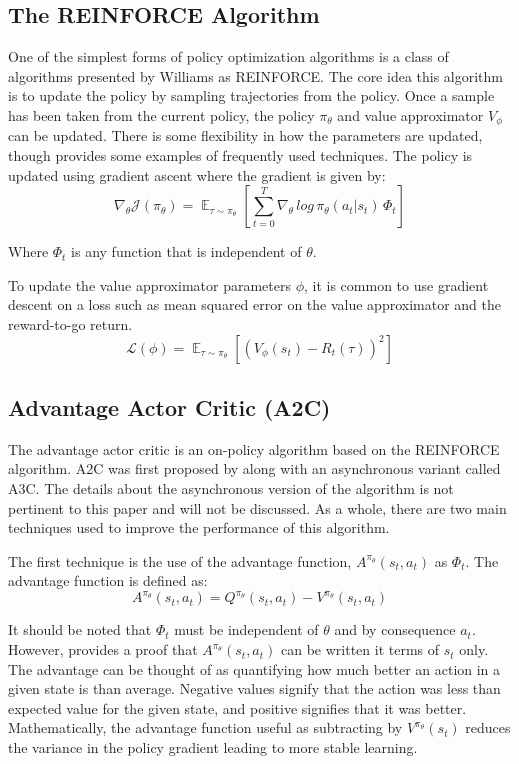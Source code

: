 \documentclass[conference]{IEEEtran}
\begin{document}
\subsection{The REINFORCE Algorithm}

One of the simplest forms of policy optimization algorithms is a class of algorithms presented by Williams as REINFORCE. \cite{REINFORCE} The core idea this algorithm is to update the policy by sampling trajectories from the policy. Once a sample has been taken from the current policy, the policy $\pi_\theta$ and value approximator $V_\phi$ can be updated. There is some flexibility in how the parameters are updated, though \cite{spinning_up_policy_optimization} provides some examples of frequently used techniques. The policy is updated using gradient ascent where the gradient is given by:
$$
    \nabla_\theta\mathcal{J(\pi_\theta)} = \mathop{\mathbb{E}}_{\tau \sim \pi_\theta} \left[\sum_{t=0}^{T}\nabla_\theta \, log \, \pi_\theta(a_t | s_t) \, \Phi_t \right]
$$
\begin{flushleft}
    Where $\Phi_t$ is any function that is independent of $\theta$.
\end{flushleft}


To update the value approximator parameters $\phi$, it is common to use gradient descent on a loss such as mean squared error on the value approximator and the reward-to-go return.
$$
    \mathcal{L}(\phi) = \mathop{\mathbb{E}}_{\tau \sim \pi_\theta} \left[\left(V_\phi(s_t) - R_t(\tau)\right)^2\right]
$$

\subsection{Advantage Actor Critic (A2C)}

The advantage actor critic is an on-policy algorithm based on the REINFORCE algorithm. A2C was first proposed by \cite{A2C} along with an asynchronous variant called A3C. The details about the asynchronous version of the algorithm is not pertinent to this paper and will not be discussed. As a whole, there are two main techniques used to improve the performance of this algorithm.

The first technique is the use of the advantage function, $A^{\pi_\theta}(s_t, a_t)$ as $\Phi_t$. The advantage function is defined as:
$$
    A^{\pi_\theta}(s_t, a_t) = Q^{\pi_\theta}(s_t, a_t) - V^{\pi_\theta}(s_t, a_t)
$$

It should be noted that $\Phi_t$ must be independent of $\theta$ and by consequence $a_t$. However, \cite{spinning_up_policy_optimization} provides a proof that $A^{\pi_\theta}(s_t, a_t)$ can be written it terms of $s_t$ only. The advantage can be thought of as quantifying how much better an action in a given state is than average. Negative values signify that the action was less than expected value for the given state, and positive signifies that it was better. Mathematically, the advantage function useful as subtracting by $V^{\pi_\theta}(s_t)$ reduces the variance in the policy gradient leading to more stable learning.
\end{document}
